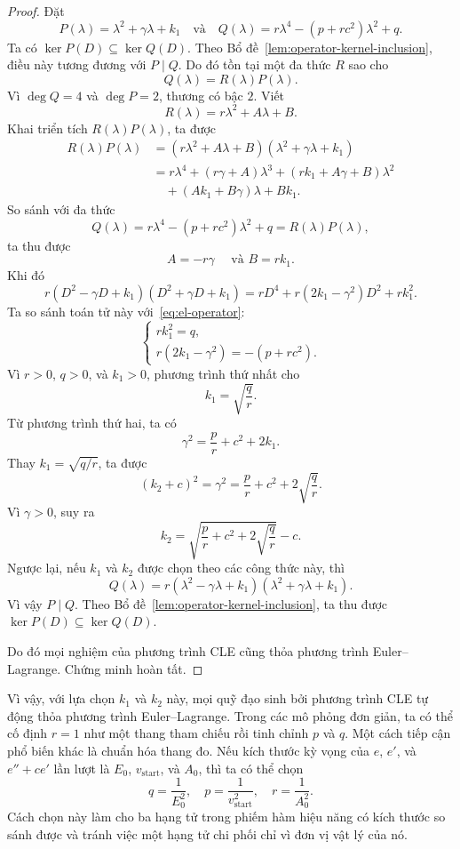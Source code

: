﻿\documentclass[12pt]{article}
\begin{document}
\begin{proof}
Đặt
\[
 P(\lambda) = \lambda^2 + \gamma\lambda + k_1\quad\text{và}\quad
 Q(\lambda) = r\lambda^4 - (p + rc^2)\lambda^2 + q.
\]
Ta có
$
 \ker P(D) \subseteq \ker Q(D)
$. Theo Bổ đề~\ref{lem:operator-kernel-inclusion}, điều này tương đương với $P \mid Q$.
Do đó tồn tại một đa thức $R$ sao cho
\[
 Q(\lambda) = R(\lambda)P(\lambda).
\]
Vì $\deg Q = 4$ và $\deg P = 2$, thương có bậc $2$. Viết
\[
 R(\lambda) = r\lambda^2 + A\lambda + B.
\]Khai triển tích $R(\lambda)P(\lambda)$, ta được
\[
\begin{aligned}
 R(\lambda)P(\lambda)
 & = (r\lambda^2 + A\lambda + B)(\lambda^2 + \gamma\lambda + k_1)\\
 & = r\lambda^4 + (r\gamma + A)\lambda^3 + (rk_1 + A\gamma + B)\lambda^2\\
 &\quad + (Ak_1 + B\gamma)\lambda + Bk_1.
\end{aligned}
\]
So sánh với đa thức
\[
 Q(\lambda) = r\lambda^4 - (p + rc^2)\lambda^2 + q = R(\lambda)P(\lambda),
\]
ta thu được
\[
 A = -r\gamma \quad \text{ và }B = rk_1.
\]
Khi đó
\[
 r(D^2 - \gamma D + k_1)(D^2 + \gamma D + k_1) = rD^4 + r(2k_1 - \gamma^2)D^2 + rk_1^2.
\]
Ta so sánh toán tử này với~\eqref{eq:el-operator}:
\[
\begin{cases}
 rk_1^2 = q,\\
 r(2k_1 - \gamma^2) = -(p + rc^2).
\end{cases}
\]
Vì $r > 0$, $q > 0$, và $k_1 > 0$, phương trình thứ nhất cho
\[
 k_1 = \sqrt{\frac{q}{r}}.
\]
Từ phương trình thứ hai, ta có
\[
 \gamma^2 = \frac{p}{r} + c^2 + 2k_1.
\]
Thay $k_1 = \sqrt{q/r}$, ta được
\[
 (k_2 + c)^2 = \gamma^2 = \frac{p}{r} + c^2 + 2\sqrt{\frac{q}{r}}.
\]
Vì $\gamma > 0$, suy ra
\[
 k_2 = \sqrt{ \frac{p}{r} + c^2 + 2\sqrt{\frac{q}{r}} } - c.
\]
Ngược lại, nếu $k_1$ và $k_2$ được chọn theo các công thức này, thì
\[
 Q(\lambda) = r(\lambda^2 - \gamma\lambda + k_1)(\lambda^2 + \gamma\lambda + k_1).
\]
Vì vậy $P\mid Q$. Theo Bổ đề~\ref{lem:operator-kernel-inclusion}, ta thu được
$\ker P(D) \subseteq \ker Q(D)$.

Do đó mọi nghiệm của phương trình CLE cũng thỏa phương trình Euler--Lagrange. Chứng minh hoàn tất.
\end{proof}
Vì vậy, với lựa chọn $k_1$ và $k_2$ này, mọi quỹ đạo sinh bởi phương trình CLE tự động thỏa phương trình Euler--Lagrange. Trong các mô phỏng đơn giản, ta có thể cố định $r = 1$ như một thang tham chiếu rồi tinh chỉnh $p$ và $q$.
Một cách tiếp cận phổ biến khác là chuẩn hóa thang đo.
Nếu kích thước kỳ vọng của $e$, $e'$, và $e'' + ce'$ lần lượt là $E_0$, $v_{\mathrm{start}}$, và $A_0$, thì ta có thể chọn
\[
 q = \frac{1}{E_0^2},\quad p = \frac{1}{v_{\mathrm{start}}^2},\quad r = \frac{1}{A_0^2}.
\]
Cách chọn này làm cho ba hạng tử trong phiếm hàm hiệu năng có kích thước so sánh được và tránh việc một hạng tử chi phối chỉ vì đơn vị vật lý của nó.
\end{document}
